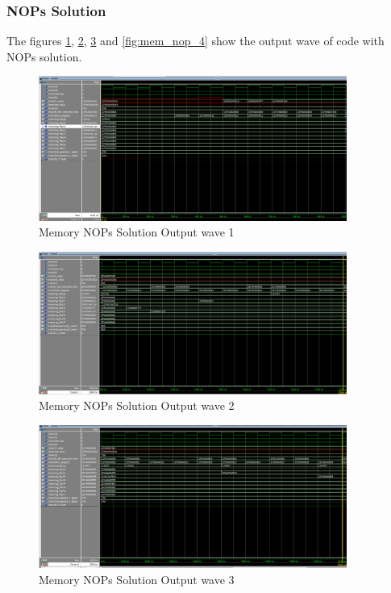 \subsubsection{NOPs Solution}
The figures \ref{fig:mem_nop_1}, \ref{fig:mem_nop_2}, \ref{fig:mem_nop_3} and \ref{fig:mem_nop_4} show the output wave of code with NOPs solution.
\begin{figure}[H]
    \centering
    \includegraphics[width=0.9\textwidth]{images/test_cases/memory/Memory_NOP_1.PNG}
    \caption{Memory NOPs Solution Output wave 1}
    \label{fig:mem_nop_1}
\end{figure}

\begin{figure}[H]
    \centering
    \includegraphics[width=0.9\textwidth]{images/test_cases/memory/Memory_NOP_2.PNG}
    \caption{Memory NOPs Solution Output wave 2}
    \label{fig:mem_nop_2}
\end{figure}

\begin{figure}[H]
    \centering
    \includegraphics[width=0.9\textwidth]{images/test_cases/memory/Memory_NOP_3.PNG}
    \caption{Memory NOPs Solution Output wave 3}
    \label{fig:mem_nop_3}
\end{figure}

